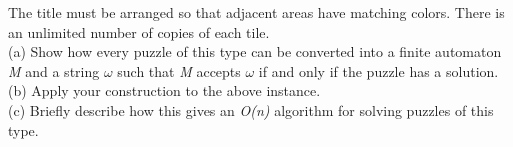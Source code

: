 \documentclass{knittingpattern}
\begin{document}
\bigskip
\bigskip
\raggedright
The title must be arranged so that adjacent areas have matching colors. There is an unlimited number of copies of each tile.\\
\bigskip
(a) \hspace{1mm} Show how every puzzle of this type can be converted into a finite automaton \textit{M} and a string $\omega$ such that \textit{M} accepts  $\omega$ if and only if the puzzle has a solution. \\
\medskip
(b) \hspace{1mm} Apply your construction to the above instance.\\
\medskip
(c) \hspace{1mm} Briefly describe how this gives an \textit{O(n)} algorithm for solving puzzles of this type.\\
\end{document}
